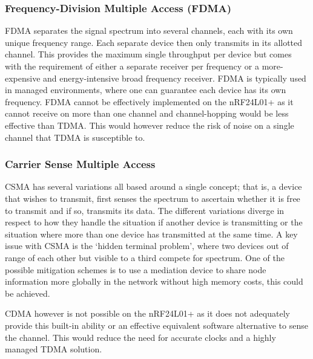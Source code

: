 \subsubsection{Frequency-Division Multiple Access (FDMA)}
FDMA separates the signal spectrum into several channels, each with its own unique frequency
range. Each separate device then only transmits in its allotted channel. This provides the maximum
single throughput per device but comes with the requirement of either a separate receiver per
frequency or a more-expensive and energy-intensive broad frequency receiver. FDMA is typically
used in managed environments, where one can guarantee each device has its own frequency.
FDMA cannot be effectively implemented on the nRF24L01+ as it cannot receive on more than one
channel and channel-hopping would be less effective than TDMA. This would however reduce the
risk of noise on a single channel that TDMA is susceptible to.

\subsubsection{Carrier Sense Multiple Access}
CSMA has several variations all based around a single concept; that is, a device that wishes to
transmit, first senses the spectrum to ascertain whether it is free to transmit and if so, transmits its
data. The different variations diverge in respect to how they handle the situation if another device is
transmitting or the situation where more than one device has transmitted at the same time.
A key issue with CSMA is the ‘hidden terminal problem’, where two devices out of range of each
other but visible to a third compete for spectrum. One of the possible mitigation schemes is to use a
mediation device to share node information more globally in the network without high memory
costs, this could be achieved.


CDMA however is not possible on the nRF24L01+ as it does not adequately provide this built-in
ability or an effective equivalent software alternative to sense the channel. This would reduce the
need for accurate clocks and a highly managed TDMA solution.


